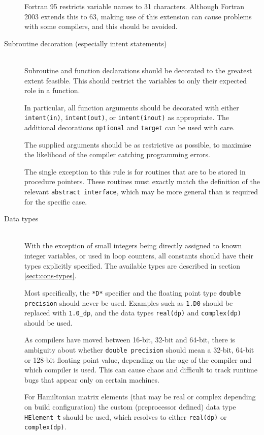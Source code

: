 \documentclass[a4paper,notitlepage]{scrreprt}
\newcommand\headitem[1]{\needspace{1.5\baselineskip}\item[{\boldmath #1 \nopagebreak}] \hfill \\ \nopagebreak}
\let\code\lstinline
\begin{document}
\begin{description}
		Fortran 95 restricts variable names to 31 characters. Although
		Fortran 2003 extends this to 63, making use of this extension can cause
		problems with some compilers, and this should be avoided.

	\headitem{Subroutine decoration (especially intent statements)}
		Subroutine and function declarations should be decorated to the
		greatest extent feasible. This should restrict the variables to only
		their expected role in a function.

		In particular, all function arguments should be decorated with either
		\code{intent(in)}, \code{intent(out)}, or
		\code{intent(inout)} as appropriate. The additional decorations
		\code{optional} and \code{target} can be used with care.

		The supplied arguments should be as restrictive as possible, to
		maximise the likelihood of the compiler catching programming errors.

		The single exception to this rule is for routines that are to be
		stored in procedure pointers. These routines must exactly match the
		definition of the relevant \code{abstract interface}, which may
		be more general than is required for the specific case.
		
	\headitem{Data types}
		With the exception of small integers being directly assigned to known
		integer variables, or used in loop counters, all constants should have
		their types explicitly specified. The available types are described
		in section \ref{sect:cons-types}.

		Most specifically, the \code{*D*} specifier and the floating
		point type \code{double precision} should never be used. Examples
		such as \code{1.D0} should be replaced with \code{1.0_dp},
		and the data types \code{real(dp)} and \code{complex(dp)}
		should be used.

		As compilers have moved between 16-bit, 32-bit and 64-bit, there is
		ambiguity about whether \code{double precision} should mean a
		32-bit, 64-bit or 128-bit floating point value, depending on the age
		of the compiler and which compiler is used. This can cause chaos and
		difficult to track runtime bugs that appear only on certain machines.

		For Hamiltonian matrix elements (that may be real or complex depending
		on build configuration) the custom (preprocessor defined) data type
		\code{HElement_t} should be used, which resolves to either
		\code{real(dp)} or \code{complex(dp)}.
		

\end{description}
\end{document}
